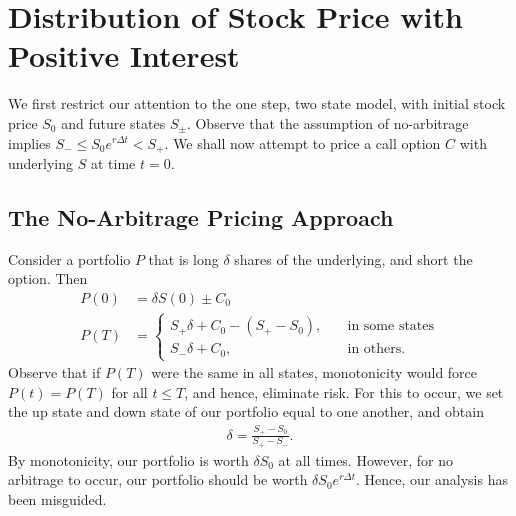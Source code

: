 \documentclass[12pt]{amsbook}
\theoremstyle{plain}
\theoremstyle{definition}
\theoremstyle{remark}
\numberwithin{equation}{section}  %
\begin{document}
\section{Distribution of Stock Price with Positive Interest}
We first restrict our attention to the one step, two state model, with
initial stock price $S_{0}$ and future states $S_{\pm}$. Observe that
the assumption of no-arbitrage implies $S_{-} \le S_{0}e^{r \Delta t} < S_{+}$.
We shall now attempt to price a call option $C$ with underlying $S$ at time
$t=0$. 

\subsection{The No-Arbitrage Pricing Approach}
Consider a portfolio $P$ that is long $\delta$
shares of the underlying, and short the option. Then
\begin{equation*}
	\begin{split}
		P(0)  & = \delta S(0) \pm C_{0} 
		\\
		P(T)  & = \begin{cases}
			S_{+} \delta + C_{0} - (S_{+} - S_{0}), \quad & \text{in some states}
			\\
			S_{-} \delta + C_{0}, \quad & \text{in others}.
		\end{cases}
	\end{split}
\end{equation*}
Observe that if $P(T)$ were the same in all states, monotonicity would force
$P(t) = P(T)$ for all $t \le T$, and hence, eliminate risk. For this to occur,
we set the up state and down state of our portfolio equal to one another, and
obtain 
\begin{equation}\label{risk-free-delta}
	\begin{split}
		\delta = \frac{S_{+} - S_{0}}{S_{+} - S_{-}}.	
	\end{split}
\end{equation}
By monotonicity, our portfolio is worth $\delta S_{0}$ at all times. 
However, for no arbitrage to occur, our portfolio should be worth
$\delta S_{0} e^{r \Delta t}$. Hence, our analysis has been misguided.
\end{document}
